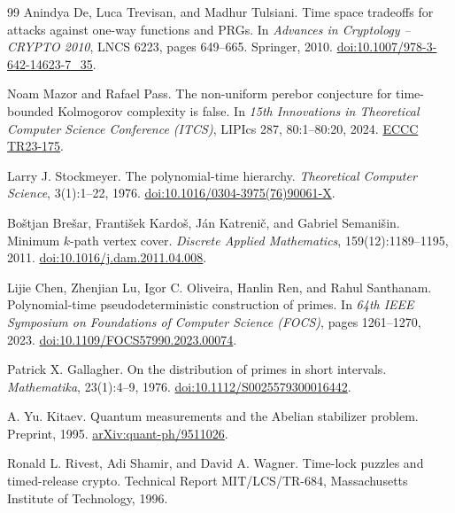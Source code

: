 \documentclass[11pt]{article}
\theoremstyle{definition}
\theoremstyle{remark}
\numberwithin{equation}{section}
\begin{document}
\begin{thebibliography}{99}
Anindya De, Luca Trevisan, and Madhur Tulsiani.
\newblock Time space tradeoffs for attacks against one-way functions and
{PRG}s.
\newblock In \emph{Advances in Cryptology -- CRYPTO 2010}, LNCS 6223,
pages 649--665. Springer, 2010.
\newblock \href{https://doi.org/10.1007/978-3-642-14623-7_35}{doi:10.1007/978-3-642-14623-7\_35}.

Noam Mazor and Rafael Pass.
\newblock The non-uniform perebor conjecture for time-bounded
{K}olmogorov complexity is false.
\newblock In \emph{15th Innovations in Theoretical Computer Science
Conference (ITCS)}, LIPIcs 287, 80:1--80:20, 2024.
\newblock \href{https://eccc.weizmann.ac.il/report/2023/175/}{ECCC TR23-175}.

Larry J. Stockmeyer.
\newblock The polynomial-time hierarchy.
\newblock \emph{Theoretical Computer Science}, 3(1):1--22, 1976.
\newblock \href{https://doi.org/10.1016/0304-3975(76)90061-X}{doi:10.1016/0304-3975(76)90061-X}.

Bo\v{s}tjan Bre\v{s}ar, Franti\v{s}ek Kardo\v{s}, J\'an Katreni\v{c}, and
Gabriel Semani\v{s}in.
\newblock Minimum $k$-path vertex cover.
\newblock \emph{Discrete Applied Mathematics}, 159(12):1189--1195, 2011.
\newblock \href{https://doi.org/10.1016/j.dam.2011.04.008}{doi:10.1016/\allowbreak j.dam.2011.04.008}.

Lijie Chen, Zhenjian Lu, Igor C. Oliveira, Hanlin Ren, and Rahul Santhanam.
\newblock Polynomial-time pseudodeterministic construction of primes.
\newblock In \emph{64th IEEE Symposium on Foundations of Computer
Science (FOCS)}, pages 1261--1270, 2023.
\newblock \href{https://doi.org/10.1109/FOCS57990.2023.00074}{doi:10.1109/FOCS57990.2023.00074}.

Patrick X. Gallagher.
\newblock On the distribution of primes in short intervals.
\newblock \emph{Mathematika}, 23(1):4--9, 1976.
\newblock \href{https://doi.org/10.1112/S0025579300016442}{doi:10.1112/S0025579300016442}.

A. Yu. Kitaev.
\newblock Quantum measurements and the {Abelian} stabilizer problem.
\newblock Preprint, 1995.
\newblock \href{https://arxiv.org/abs/quant-ph/9511026}{arXiv:quant-ph/9511026}.

Ronald L. Rivest, Adi Shamir, and David A. Wagner.
\newblock Time-lock puzzles and timed-release crypto.
\newblock Technical Report MIT/LCS/TR-684, Massachusetts Institute of
Technology, 1996.


\end{thebibliography}
\end{document}
